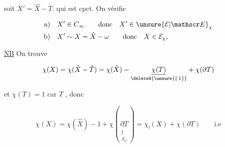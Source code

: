 
soit $X'=\hat X-\mathring T$. qui est cpct.  On vérifie


\[
\begin{aligned}
\text{a)}\quad & X'\in C_\infty \qquad\text{donc}\quad X'\in \unsure{\mathcal E|\mathscr E}_\chi\\
\text{b)}\quad & X'\sim X=\hat X-\omega \qquad\text{donc}\quad X\in\mathcal E_\chi,
\end{aligned}
\]

\uline{NB} On trouve

\[
\chi(X)=\chi(\hat X-\mathring T)=\chi(\hat X)-\underset{\deleted{\unsure{\Vert\,1}}}{\underline{\chi(T)}}+\chi(\partial T)
\]

et $\chi(T)=1$ car $T$ , donc

\[
\chi(X)=\chi(\hat X)-1+\chi(\underset{\substack{\Vert\\ S_\omega}}{\underline{\partial T}})=\chi_!(X)+\chi(\partial T)\qquad\text{i.e}
\]

